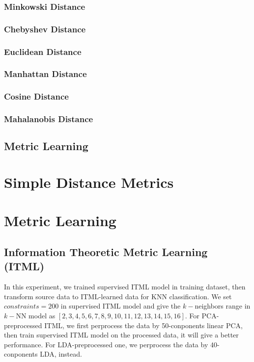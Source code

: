 \documentclass[conference]{IEEEtran}
\begin{document}
\subsubsection{Minkowski Distance}
\subsubsection{Chebyshev Distance}
\subsubsection{Euclidean Distance}
\subsubsection{Manhattan Distance}
\subsubsection{Cosine Distance}
\subsubsection{Mahalanobis Distance}
\subsection{Metric Learning}
\section{Simple Distance Metrics}
\section{Metric Learning}
\subsection{Information Theoretic Metric Learning (ITML)}

In this experiment, we trained supervised ITML model in training dataset, then transform source data to ITML-learned data for KNN classification. We set $constraints=200$ in supervised ITML model and give the $k-$neighbors range in $k-$NN model as $[2, 3, 4, 5, 6, 7, 8, 9, 10, 11, 12, 13, 14, 15, 16]$. For PCA-preprocessed ITML, we first perprocess the data by 50-conponents linear PCA, then train supervised ITML model on the processed data, it will give a better performance. For LDA-preprocessed one, we perprocess the data by 40-conponents LDA, instead.
\end{document}
